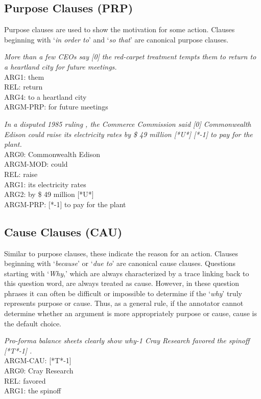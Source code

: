 \documentclass[11pt]{report}
\begin{document}
\subsection{Purpose Clauses (PRP)}
\label{ssec: PRP}

Purpose clauses are used to show the motivation for some action. Clauses beginning with `\textit{in order to}' and `\textit{so that}' are canonical purpose clauses.

\textit{More than a few CEOs say [0] the red-carpet treatment tempts them to return to a heartland city for future meetings.}\\
ARG1:        them \\
REL:        return \\
ARG4:        to a heartland city\\ 
ARGM-PRP:        for future meetings

\textit{In a disputed 1985 ruling , the Commerce Commission said [0] Commonwealth Edison could raise its electricity rates by \$ 49 million [*U*] [*-1] to pay for the plant.}\\
ARG0:        Commonwealth Edison \\
ARGM-MOD:        could \\
REL:        raise \\
ARG1:        its electricity rates\\ 
ARG2:        by \$ 49 million [*U*]\\ 
ARGM-PRP:        [*-1] to pay for the plant

\subsection{Cause Clauses (CAU)} 
\label{ssec: CAU}

Similar to purpose clauses, these indicate the reason for an action. Clauses beginning with `\textit{because}' or `\textit{due to}' are canonical cause clauses.  Questions starting with `\textit{Why},' which are always characterized by a trace linking back to this question word, are always treated as cause. However, in these question phrases it can often be difficult or impossible to determine if the `\textit{why}' truly represents purpose or cause.  Thus, as a general rule, if the annotator cannot determine whether an argument is more appropriately purpose or cause, cause is the default choice.  

\textit{Pro-forma balance sheets clearly show why-1 Cray Research favored the spinoff [*T*-1] .}\\
ARGM-CAU:        [*T*-1]  \\
ARG0:        Cray Research \\
REL:        favored \\
ARG1:        the spinoff
\end{document}
